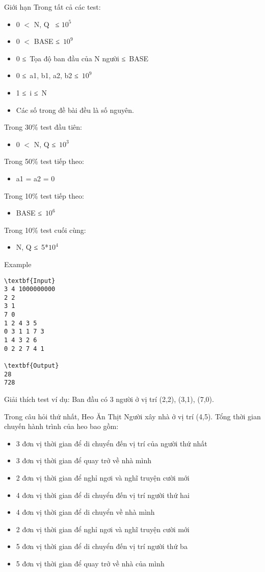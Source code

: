 Giới hạn  
Trong tất cả các test:  
\begin{itemize}
	\item     0 $<$ N, Q  ≤ $10^{5}$
	\item     0 $<$ BASE ≤ $10^{9}$
	\item     0 ≤ Tọa độ ban đầu của N người ≤ BASE   
	\item     0 ≤ a1, b1, a2, b2 ≤ $10^{9}$
	\item     1 ≤ i ≤ N   
	\item     Các số trong đề bài đều là số nguyên.   
\end{itemize}

   Trong 30\% test đầu tiên:  
\begin{itemize}
	\item     0 $<$ N, Q ≤ $10^{3}$
\end{itemize}

   Trong 50\% test tiếp theo:  
\begin{itemize}
	\item     a1 = a2 = 0   
\end{itemize}

   Trong 10\% test tiếp theo:  
\begin{itemize}
	\item     BASE ≤ $10^{6}$
\end{itemize}

   Trong 10\% test cuối cùng:  
\begin{itemize}
	\item     N, Q ≤ 5*$10^{4}$
\end{itemize}
   Example  
\begin{verbatim}
\textbf{Input}
3 4 1000000000
2 2
3 1
7 0
1 2 4 3 5
0 3 1 1 7 3
1 4 3 2 6
0 2 2 7 4 1

\textbf{Output}
28
728\end{verbatim}
   Giải thích test ví dụ:  
Ban đầu có 3 người ở vị trí (2,2), (3,1), (7,0).  

   Trong câu hỏi thứ nhất, Heo Ăn Thịt Người xây nhà ở vị trí (4,5). Tổng thời gian chuyến hành trình của heo bao gồm:  
\begin{itemize}
	\item     3 đơn vị thời gian để di chuyển đến vị trí của người thứ nhất   
	\item     3 đơn vị thời gian để quay trở về nhà mình   
	\item     2 đơn vị thời gian để nghỉ ngơi và nghĩ truyện cười mới   
	\item     4 đơn vị thời gian để di chuyển đến vị trí người thứ hai   
	\item     4 đơn vị thời gian để di chuyển về nhà mình   
	\item     2 đơn vị thời gian để nghỉ ngơi và nghĩ truyện cười mới   
	\item     5 đơn vị thời gian để di chuyển đến vị trí người thứ ba   
	\item     5 đơn vị thời gian để quay trở về nhà của mình   
\end{itemize}

